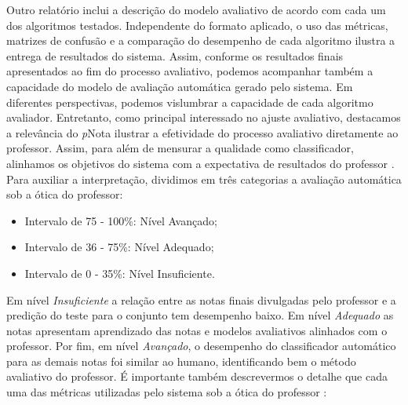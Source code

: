 Outro relatório inclui a descrição do modelo avaliativo de acordo com cada um dos algoritmos testados. Independente do formato aplicado, o uso das métricas, matrizes de confusão e a comparação do desempenho de cada algoritmo ilustra a entrega de resultados do sistema. Assim, conforme os resultados finais apresentados ao fim do processo avaliativo, podemos acompanhar também a capacidade do modelo de avaliação automática gerado pelo sistema. Em diferentes perspectivas, podemos vislumbrar a capacidade de cada algoritmo avaliador. Entretanto, como principal interessado no ajuste avaliativo, destacamos a relevância do \textit{p}Nota ilustrar a efetividade do processo avaliativo diretamente ao professor. Assim, para além de mensurar a qualidade como classificador, alinhamos os objetivos do sistema com a expectativa de resultados do professor \cite{nascimento2020}. Para auxiliar a interpretação, dividimos em três categorias a avaliação automática sob a ótica do professor:

\begin{itemize}
	\item Intervalo de 75 - 100\%: Nível Avançado;
	\item Intervalo de 36 - 75\%: Nível Adequado;
	\item Intervalo de 0 - 35\%: Nível Insuficiente.
\end{itemize}

Em nível \textit{Insuficiente} a relação entre as notas finais divulgadas pelo professor e a predição do teste para o conjunto tem desempenho baixo. Em nível \textit{Adequado} as notas apresentam aprendizado das notas e modelos avaliativos alinhados com o professor. Por fim, em nível \textit{Avançado}, o desempenho do classificador automático para as demais notas foi similar ao humano, identificando bem o método avaliativo do professor. É importante também descrevermos o detalhe que cada uma das métricas utilizadas pelo sistema sob a ótica do professor \cite{nascimento2020}:

